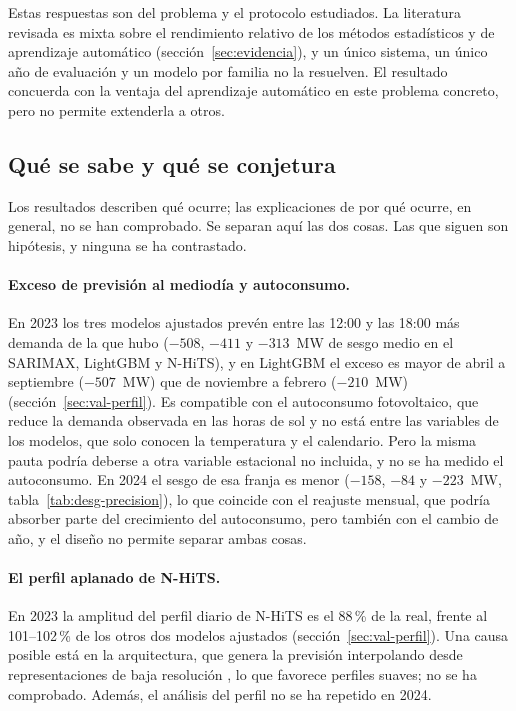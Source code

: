 Estas respuestas son del problema y el protocolo estudiados. La literatura
revisada es mixta sobre el rendimiento relativo de los métodos estadísticos y de
aprendizaje automático (sección~\ref{sec:evidencia}), y un único sistema, un
único año de evaluación y un modelo por familia no la resuelven. El resultado
concuerda con la ventaja del aprendizaje automático en este problema concreto,
pero no permite extenderla a otros.

\subsection{Qué se sabe y qué se conjetura}\label{sec:disc-hipotesis}

Los resultados describen qué ocurre; las explicaciones de por qué ocurre, en
general, no se han comprobado. Se separan aquí las dos cosas. Las que siguen son
hipótesis, y ninguna se ha contrastado.

\paragraph{Exceso de previsión al mediodía y autoconsumo.} En 2023 los tres
modelos ajustados prevén entre las 12:00 y las 18:00 más demanda de la que hubo
($-508$, $-411$ y $-313$~MW de sesgo medio en el SARIMAX, LightGBM y N-HiTS), y en
LightGBM el exceso es mayor de abril a septiembre ($-507$~MW) que de noviembre a
febrero ($-210$~MW) (sección~\ref{sec:val-perfil}). Es compatible con el
autoconsumo fotovoltaico, que reduce la demanda observada en las horas de sol y
no está entre las variables de los modelos, que solo conocen la temperatura y el
calendario. Pero la misma pauta podría deberse a otra variable estacional no
incluida, y no se ha medido el autoconsumo. En 2024 el sesgo de esa franja es
menor ($-158$, $-84$ y $-223$~MW, tabla~\ref{tab:desg-precision}), lo que
coincide con el reajuste mensual, que podría absorber parte del crecimiento del
autoconsumo, pero también con el cambio de año, y el diseño no permite separar
ambas cosas.

\paragraph{El perfil aplanado de N-HiTS.} En 2023 la amplitud del perfil diario
de N-HiTS es el 88\,\% de la real, frente al 101--102\,\% de los otros dos modelos
ajustados (sección~\ref{sec:val-perfil}). Una causa posible está en la
arquitectura, que genera la previsión interpolando desde representaciones de
baja resolución \parencite{challu2023nhits}, lo que favorece perfiles suaves; no
se ha comprobado. Además, el análisis del perfil no se ha repetido en 2024.

